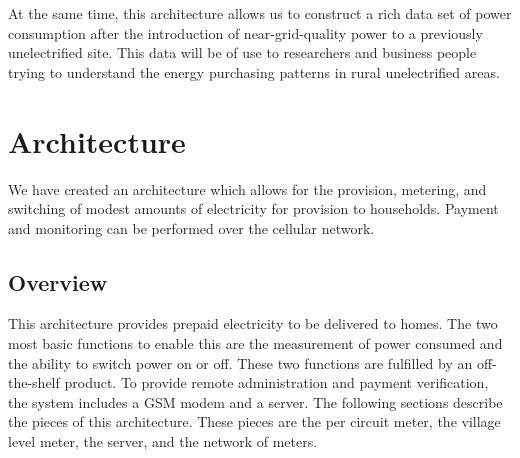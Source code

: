 \documentclass[conference]{IEEEtran}
\begin{document}
At the same time, this architecture allows us to construct
a rich data set of
power consumption after the introduction of near-grid-quality
power to a previously unelectrified site.
This data will be of use to researchers and business people 
trying to understand the energy purchasing patterns in rural 
unelectrified areas.


\section{Architecture}
We have created an architecture which allows for the provision,
metering, and switching of modest amounts of electricity for
provision to households.
Payment and monitoring can be performed over the cellular network.

\subsection{Overview}
This architecture provides prepaid electricity to be delivered to 
homes.  The two most basic functions to enable this are the measurement
of power consumed and the ability to switch power on or off.  These
two functions are fulfilled by an off-the-shelf product.  To provide
remote administration and payment verification, the system includes
a GSM modem and a server.  The following sections describe the pieces
of this architecture.  These pieces are the per circuit meter, the 
village level meter, the server, and the network of meters.
\end{document}
